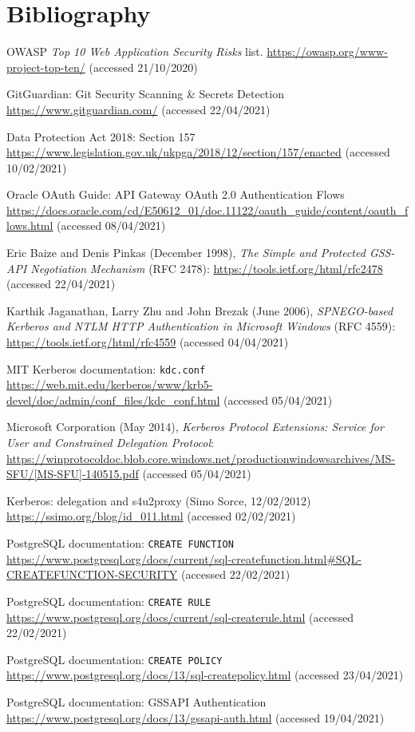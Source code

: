 \documentclass{article}
\begin{document}
\section*{Bibliography}
\begin{thebibliography}{9}
 OWASP \textit{Top 10 Web Application Security Risks} list. \url{https://owasp.org/www-project-top-ten/} (accessed 21/10/2020)

 GitGuardian: Git Security Scanning \& Secrets Detection \url{https://www.gitguardian.com/} (accessed 22/04/2021)

 Data Protection Act 2018: Section 157 \url{https://www.legislation.gov.uk/ukpga/2018/12/section/157/enacted} (accessed 10/02/2021)

 Oracle OAuth Guide: API Gateway OAuth 2.0 Authentication Flows \url{https://docs.oracle.com/cd/E50612_01/doc.11122/oauth_guide/content/oauth_flows.html} (accessed 08/04/2021)

 Eric Baize and Denis Pinkas (December 1998), \textit{The Simple and Protected GSS-API Negotiation Mechanism} (RFC 2478): \url{https://tools.ietf.org/html/rfc2478} (accessed 22/04/2021)

 Karthik Jaganathan, Larry Zhu and John Brezak (June 2006), \textit{SPNEGO-based Kerberos and NTLM HTTP Authentication in Microsoft Windows} (RFC 4559): \url{https://tools.ietf.org/html/rfc4559} (accessed 04/04/2021)

 MIT Kerberos documentation: \texttt{kdc.conf} \url{https://web.mit.edu/kerberos/www/krb5-devel/doc/admin/conf_files/kdc_conf.html} (accessed 05/04/2021)

 Microsoft Corporation (May 2014), \textit{Kerberos Protocol Extensions: Service for User and Constrained Delegation Protocol}: \url{https://winprotocoldoc.blob.core.windows.net/productionwindowsarchives/MS-SFU/[MS-SFU]-140515.pdf} (accessed 05/04/2021)

  Kerberos: delegation and s4u2proxy (Simo Sorce, 12/02/2012) \url{https://ssimo.org/blog/id_011.html} (accessed 02/02/2021)

 PostgreSQL documentation: \texttt{CREATE FUNCTION} \url{https://www.postgresql.org/docs/current/sql-createfunction.html#SQL-CREATEFUNCTION-SECURITY} (accessed 22/02/2021)

 PostgreSQL documentation: \texttt{CREATE RULE} \url{https://www.postgresql.org/docs/current/sql-createrule.html} (accessed 22/02/2021)

 PostgreSQL documentation: \texttt{CREATE POLICY} \url{https://www.postgresql.org/docs/13/sql-createpolicy.html} (accessed 23/04/2021)

 PostgreSQL documentation: GSSAPI Authentication \url{https://www.postgresql.org/docs/13/gssapi-auth.html} (accessed 19/04/2021)
\end{thebibliography}
\end{document}
